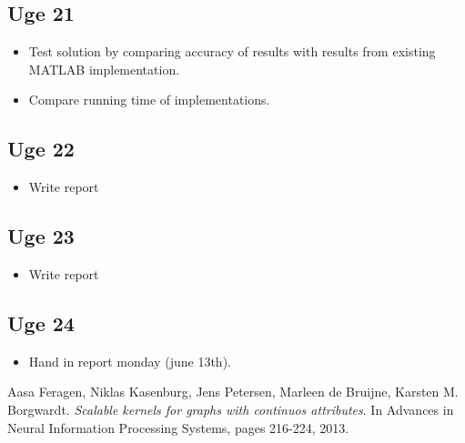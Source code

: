 \documentclass{article}
\begin{document}
\subsection{Uge 21}
\begin{itemize}
	\item Test solution by comparing accuracy of results with results from existing MATLAB implementation.
	\item Compare running time of implementations.
\end{itemize}
\subsection{Uge 22}
\begin{itemize}
	\item Write report
\end{itemize}
\subsection{Uge 23}
\begin{itemize}
	\item Write report
\end{itemize}
\subsection{Uge 24}
\begin{itemize}
	\item Hand in report monday (june 13th).
\end{itemize}


\newpage
\renewcommand\refname{References}
\begin{thebibliography}{9}
	Aasa Feragen, Niklas Kasenburg, Jens Petersen, Marleen de Bruijne, Karsten M. Borgwardt.
	\emph{Scalable kernels for graphs with continuos attributes}.
	In Advances in Neural Information Processing Systems, pages 216-224, 2013.
\end{thebibliography}
\end{document}
